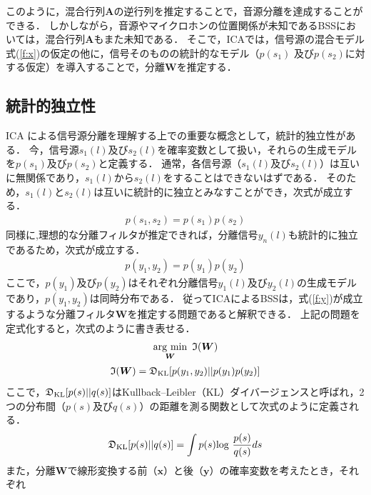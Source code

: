 このように，混合行列$\bm{A}$の逆行列を推定することで，音源分離を達成することができる．
しかしながら，音源やマイクロホンの位置関係が未知であるBSSにおいては，混合行列$\bm{A}$もまた未知である．
そこで，ICAでは，信号源の混合モデル式(\ref{f:x})の仮定の他に，信号そのものの統計的なモデル（$p(s_1)$ 及び$p(s_2)$に対する仮定）を導入することで，分離$\bm{W}$を推定する．

\subsection{統計的独立性}
ICA による信号源分離を理解する上での重要な概念として，統計的独立性がある．
今，信号源$s_1(l)$及び$s_2(l)$を確率変数として扱い，それらの生成モデルを$p(s_1)$及び$p(s_2)$と定義する．
通常，各信号源（$s_1(l)$及び$s_2(l)$）は互いに無関係であり，$s_1(l)$から$s_2(l)$をすることはできないはずである．
そのため，$s_1(l)$と$s_2(l)$は互いに統計的に独立とみなすことができ，次式が成立する．
\begin{align}
    p(s_1,s_2) = p(s_1)p(s_2) \label{f:s}
\end{align}
同様に,理想的な分離フィルタが推定できれば，分離信号$y_n(l)$も統計的に独立であるため，次式が成立する．
\begin{align}
    p(y_1,y_2) = p(y_1)p(y_2) \label{f:y}
\end{align}
ここで，$p(y_1)$及び$p(y_2)$はそれぞれ分離信号$y_1(l)$及び$y_2(l) $の生成モデルであり，$p(y_1, y_2)$は同時分布である．
従ってICAによるBSSは，式(\ref{f:y})が成立するような分離フィルタ$\bm{W}$を推定する問題であると解釈できる．
上記の問題を定式化すると，次式のように書き表せる．
\begin{align}
   \mathop{\mathrm{arg~min}}\limits_{\bm{W}}~ \mathfrak{I}(\bm{W})
\end{align}
\begin{align}
 \mathfrak{I}(\bm{W}) = \mathfrak{D}_{\textcolor{black}{\mathrm{KL}}}[p(y_1,y_2)||p(y_1)p(y_2)] \label{f:cost}
\end{align}
ここで，$\mathfrak{D}_{\textcolor{black}{\mathrm{KL}}}[p(s)||q(s)]$はKullback--Leibler（KL）ダイバージェンスと呼ばれ，2つの分布間（$p(s)$及び$q(s)$）の距離を測る関数として次式のように定義される．
\begin{align}
\mathfrak{D}_{\textcolor{black}{\mathrm{KL}}}[p(s)||q(s)] = \int{p(s){\rm log}~\frac{p(s)}{q(s)}}ds \label{f:kld}
\end{align}
また，分離$\bm{W}$で線形変換する前（$\bm{x}$）と後（$\bm{y}$）の確率変数を考えたとき，それぞれ
